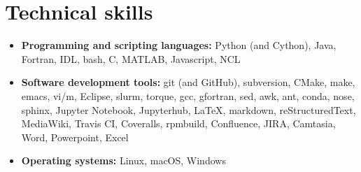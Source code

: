 \section{Technical skills}
\vspace{0.5em}

\begin{itemize}

  \item \textbf{Programming and scripting languages:}
    Python (and Cython), Java, Fortran, IDL, bash, C, MATLAB,
    Javascript, NCL

  \item \textbf{Software development tools:}
    git (and GitHub), subversion, CMake, make, emacs, vi/m, Eclipse,
    slurm, torque, gcc, gfortran, sed, awk, ant, conda, nose, sphinx,
    Jupyter Notebook, Jupyterhub, \LaTeX, markdown, reStructuredText,
    MediaWiki, {Travis CI}, Coveralls, rpmbuild, Confluence, JIRA,
    Camtasia, Word, Powerpoint, Excel

  \item \textbf{Operating systems:}
    Linux, macOS, Windows

\end{itemize}
